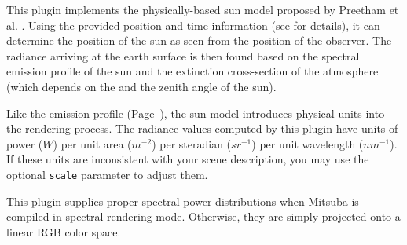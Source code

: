 This plugin implements the physically-based sun model proposed by
Preetham et al. \cite{Preetham1999Practical}. Using the provided position
and time information (see  for details), it can determine the
position of the sun as seen from the position of the observer.
The radiance arriving at the earth surface is then found based on the spectral
emission profile of the sun and the extinction cross-section of the
atmosphere (which depends on the  and the zenith angle of the sun).

Like the  emission profile (Page~\pageref{sec:blackbody}),
the sun model introduces physical units into the rendering process.
The radiance values computed by this plugin have units of power ($W$) per
unit area ($m^{-2}$) per steradian ($sr^{-1}$) per unit wavelength ($nm^{-1}$).
If these units are inconsistent with your scene description, you may use the
optional \texttt{scale} parameter to adjust them.

This plugin supplies proper spectral power distributions when Mitsuba is
compiled in spectral rendering mode. Otherwise, they are simply projected onto
a linear RGB color space.

